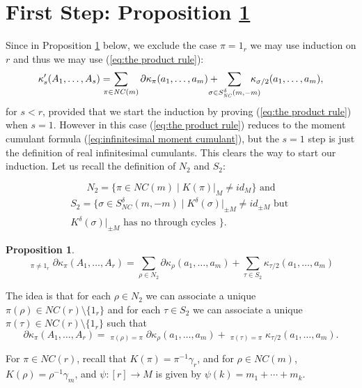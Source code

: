 \documentclass[11pt]{amsart}
\newtheorem{proposition}[theorem]{Proposition}
\theoremstyle{definition}
\numberwithin{theorem}{section}
\newcommand{\NC}{\mathit{NC}}
\newcommand{\id}{\mathit{id}}
\begin{document}
\section{First Step: Proposition \ref{prop:first}}
\label{sec:product formula first step}

Since in Proposition \ref{prop:first} below, we exclude the
case $\pi = 1_r$ we may use induction on $r$ and thus we may
use (\ref{eq:the product rule}):
\[
\kappa_s'(A_1, \dots, A_s)
= \kern-1em
\sum_{\pi \in \NC(m)} \partial \kappa_\pi(a_1, \dots, a_m)
+ \kern-1.2em
\sum_{\sigma \in S_\NC^\delta(m, -m)} \kern-1.2em \kappa_{\sigma/2}
(a_1, \dots, a_m),
\]
for $s < r$, provided that we start the induction by proving
(\ref{eq:the product rule}) when $s = 1$. However in this
case (\ref{eq:the product rule}) reduces to the moment
cumulant formula (\ref{eq:infinitesimal moment cumulant}),
but the $s = 1$ step is just the definition of real
infinitesimal cumulants. This clears the way to start our
induction. Let us recall the definition of $N_2$ and $S_2$:


\[
N_2 = \{ \pi \in \NC(m) \mid K(\pi)|_M \not= \textit{id}_M\} \mbox{\ and}
\]
\begin{multline*}
S_2 = \{ \sigma \in S_\NC^\delta(m, -m) \mid
K^\delta(\sigma)|_{\pm M} \not= \id_{\pm M} \mbox{\ but\ }
\\ K^\delta(\sigma)|_{\pm M} \mbox{\ has no through
  cycles\ }\}.
\end{multline*}




\begin{proposition}\label{prop:first}
\[
\mathop{\sum_{\pi \in\NC(r)}}_{\pi \not= 1_r}
\partial\kappa_\pi(A_1, \dots, A_r)
=
\sum_{\rho \in N_2} \partial \kappa_\rho(a_1, \dots, a_m)
+
\sum_{\tau \in S_2} \kappa_{\tau/2}(a_1, \dots, a_m)
\]
\end{proposition}


The idea is that for each $\rho \in N_2$ we can associate a
unique $\pi(\rho) \in \NC(r) \setminus \{1_r\}$ and for each
$\tau \in S_2$ we can associate a unique $\pi(\tau) \in
\NC(r) \setminus \{1_r\}$ such that
\begin{equation}\label{eq:two part strategy}
\partial\kappa_\pi(A_1, \dots, A_r)
=
\mathop{\sum_{\rho \in N_2}}_{\pi(\rho) = \pi}
 \partial \kappa_\rho(a_1, \dots, a_m)
+
\mathop{\sum_{\tau \in S_2}}
_{\pi(\tau) = \pi}
\kappa_{\tau/2}(a_1, \dots, a_m).
\end{equation}

For $\pi \in \NC(r)$, recall that $K(\pi) =
\pi^{-1}\gamma_r$, and for $\rho \in \NC(m)$, $K(\rho) =
\rho^{-1}\gamma_m$, and $\psi: [r] \rightarrow M$ is given
by $\psi(k) = m_1 + \cdots + m_k$.
\end{document}
